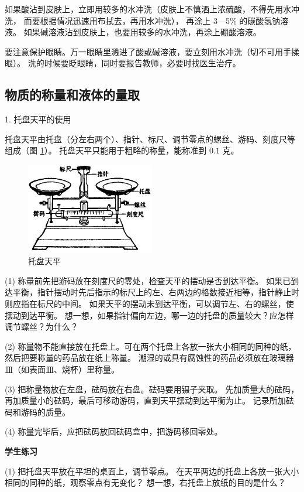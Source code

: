 如果酸沾到皮肤上，立即用较多的水冲洗（皮肤上不慎洒上浓硫酸，不得先用水冲洗，
而要根据情况迅速用布拭去，再用水冲洗）， 再涂上 3—5\% 的碳酸氢钠溶液。
如果碱溶液沾到皮肤上，也要用较多的水冲洗，再涂上硼酸溶液。

要注意保护眼睛。万一眼睛里溅进了酸或碱溶液，要立刻用水冲洗（切不可用手揉眼）。
洗的时候要眨眼睛，同时要报告教师，必要时找医生治疗。


\subsection{物质的称量和液体的量取}

1. 托盘天平的使用

托盘天平由托盘（分左右两个）、指针、标尺、调节零点的螺丝、游码、刻度尺等组成（图 \ref{fig:xssy-4}）。
托盘天平只能用于粗略的称量，能称准到 $0.1$ 克。

\begin{figure}[htbp]
    \centering
    \includegraphics[width=0.5\textwidth]{../pic/czhx1-xssy-04}
    \caption{托盘天平}\label{fig:xssy-4}
\end{figure}

(1) 称量前先把游码放在刻度尺的零处，检查天平的摆动是否到达平衡。
如果已到达平衡，指针摆动时先后指示的标尺上的左、右两边的格数接近相等，指针静止时则应指在标尺的中间。
如果天平的摆动未到达平衡，可以调节左、右的螺丝，使摆动到达平衡。
想一想，如果指针偏向左边，哪一边的托盘的质量较大？应怎样调节螺丝？为什么？

(2) 称量物不能直接放在托盘上。可在两个托盘上各放一张大小相同的同种的纸，然后把要称量的药品放在纸上称量。
潮湿的或具有腐蚀性的药品必须放在玻璃器皿（如表面皿、烧杯）里称量。

(3) 把称量物放在左盘，砝码放在右盘。砝码要用镊子夹取。
先加质量大的砝码，再加质量小的砝码，最后可移动游码，直到天平摆动到达平衡为止。
记录所加砝码和游码的质量。

(4) 称量完毕后，应把砝码放回砝码盒中，把游码移回零处。

\textbf{学生练习}

(1) 把托盘天平放在平坦的桌面上，调节零点。
在天平两边的托盘上各放一张大小相同的同种的纸，观察零点有无变化？
想一想，右托盘上放纸的目的是什么？

